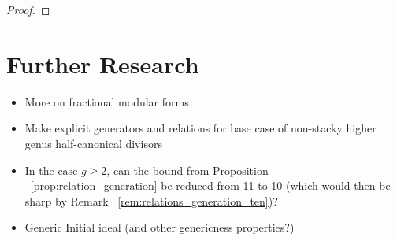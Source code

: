 \documentclass{amsart}
\theoremstyle{plain}
\theoremstyle{definition}
\theoremstyle{remark}
\numberwithin{equation}{section}
\newcommand \sx{\mathscr X}
\newcommand \halfcan{L}
\begin{document}
\begin{proof}
%
%
%
%
%
%
\end{proof}

\section{Further Research}
\label{sec:further-questions}
\begin{itemize}
	\item More on fractional modular forms
	\item Make explicit generators and relations for base case of non-stacky higher genus half-canonical divisors
	\item In the case $g \geq 2$, can the bound from Proposition ~\ref{prop:relation_generation} be reduced from 11 to 10 (which would then be sharp by Remark ~\ref{rem:relations_generation_ten})?  
	\item Generic Initial ideal (and other genericness properties?)
\end{itemize}
\end{document}
